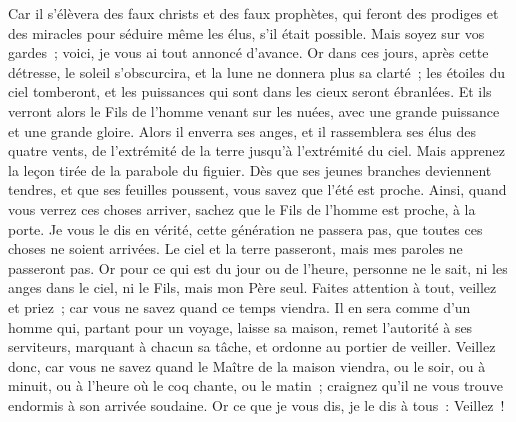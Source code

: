 \begin{multicols}{2}
Car il s'élèvera des faux christs et des faux prophètes, qui feront des prodiges et des miracles pour séduire même les élus, s'il était possible.
Mais soyez sur vos gardes~; voici, je vous ai tout annoncé d'avance.
Or dans ces jours, après cette détresse, le soleil s'obscurcira, et la lune ne donnera plus sa clarté~;
les étoiles du ciel tomberont, et les puissances qui sont dans les cieux seront ébranlées.
Et ils verront alors le Fils de l'homme venant sur les nuées, avec une grande puissance et une grande gloire.
Alors il enverra ses anges, et il rassemblera ses élus des quatre vents, de l'extrémité de la terre jusqu'à l'extrémité du ciel.
Mais apprenez la leçon tirée de la parabole du figuier. Dès que ses jeunes branches deviennent tendres, et que ses feuilles poussent, vous savez que l'été est proche.
Ainsi, quand vous verrez ces choses arriver, sachez que le Fils de l'homme est proche, à la porte.
Je vous le dis en vérité, cette génération ne passera pas, que toutes ces choses ne soient arrivées.
Le ciel et la terre passeront, mais mes paroles ne passeront pas.
Or pour ce qui est du jour ou de l'heure, personne ne le sait, ni les anges dans le ciel, ni le Fils, mais mon Père seul.
Faites attention à tout, veillez et priez~; car vous ne savez quand ce temps viendra.
Il en sera comme d'un homme qui, partant pour un voyage, laisse sa maison, remet l'autorité à ses serviteurs, marquant à chacun sa tâche, et ordonne au portier de veiller.
Veillez donc, car vous ne savez quand le Maître de la maison viendra, ou le soir, ou à minuit, ou à l'heure où le coq chante, ou le matin~;
craignez qu'il ne vous trouve endormis à son arrivée soudaine.
Or ce que je vous dis, je le dis à tous~: Veillez~!

\end{multicols}
